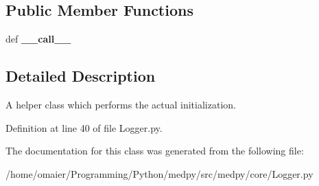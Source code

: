 \subsection*{Public Member Functions}
\begin{DoxyCompactItemize}
\item 
\hypertarget{classmedpy_1_1core_1_1Logger_1_1Logger_1_1LoggerHelper_aea5d63b929cd6340bc6f8f249956e44b}{
def {\bfseries \_\-\_\-call\_\-\_\-}}
\label{classmedpy_1_1core_1_1Logger_1_1Logger_1_1LoggerHelper_aea5d63b929cd6340bc6f8f249956e44b}

\end{DoxyCompactItemize}


\subsection{Detailed Description}
A helper class which performs the actual initialization. 

Definition at line 40 of file Logger.py.



The documentation for this class was generated from the following file:\begin{DoxyCompactItemize}
\item 
/home/omaier/Programming/Python/medpy/src/medpy/core/Logger.py\end{DoxyCompactItemize}
